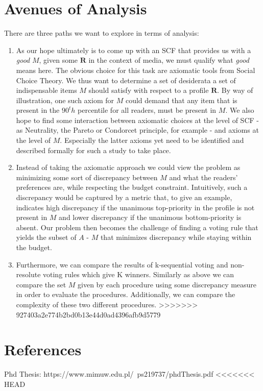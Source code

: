 \documentclass[10pt,a4paper, english]{article}
\begin{document}
\section{Avenues of Analysis} 
There are three paths we want to explore in terms of analysis:
\begin{enumerate}
\item As our hope ultimately is to come up with an SCF that provides us with a \textit{good} $M$, given some $\mathbf{R}$ in the context of media, we must qualify what \textit{good} means here. The obvious choice for this task are axiomatic tools from Social Choice Theory. We thus want to determine a set of desiderata a set of indispensable items $M$ should satisfy with respect to a profile $\mathbf{R}$. By way of illustration, one such axiom for $M$ could demand that any item that is present in the $90^th$ percentile for all readers, must be present in $M$.
We also hope to find some interaction between axiomatic choices at the level of SCF - as Neutrality, the Pareto or Condorcet principle, for example - and axioms at the level of $M$. Especially the latter axioms yet need to be identified and described formally for such a study to take place.
\item Instead of taking the axiomatic approach we could view the problem as minimizing some sort of discrepancy between $M$ and what the readers' preferences are, while respecting the budget constraint. Intuitively, such a discrepancy would be captured by a metric that, to give an example, indicates high discrepancy if the unanimous top-priority in the profile is not present in $M$ and lower discrepancy if the unanimous bottom-priority is absent. Our problem then becomes the challenge of finding a voting rule that yields the subset of $A$ - $M$ that minimizes discrepancy while staying within the budget.
\item Furthermore, we can compare the results of k-sequential voting and non-resolute voting rules which give K winners. Similarly as above we can compare the set $M$ given by each procedure using some discrepancy measure in order to evaluate the procedures. Additionally, we can compare the complexity of these two different procedures.
>>>>>>> 927403a2e774b2bd0b13e44d0ad4396afb9d5779
\end{enumerate}

\section{References}
Phd Thesis: https://www.mimuw.edu.pl/~ps219737/phdThesis.pdf
<<<<<<< HEAD
\end{document}
